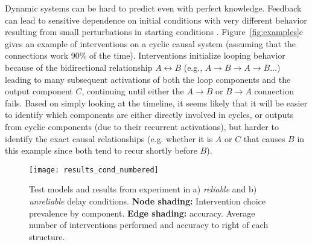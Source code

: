 \documentclass[10pt,letterpaper]{article}
\begin{document}
Dynamic systems can be hard to predict even with perfect knowledge.  Feedback can lead to sensitive dependence on initial conditions with very different behavior resulting from small perturbations in starting conditions \citep[e.g.][]{gleick1997chaos}.  
Figure~\ref{fig:examples}c gives an example of interventions on a cyclic causal system (assuming that the connections work 90\% of the time).  Interventions initialize looping behavior because of the bidirectional relationship $A \leftrightarrow B$ (e.g., $A\rightarrow B \rightarrow A \rightarrow B\ldots$) leading to many subsequent activations of both the loop components and the output component $C$, continuing until either the $A\rightarrow B$ or $B\rightarrow A$ connection fails. Based on simply looking at the timeline, it seems likely that it will be easier to identify which components are either directly involved in cycles, or outputs from cyclic components (due to their recurrent activations), but harder to identify the exact causal relationships (e.g. whether it is $A$ or $C$ that causes $B$ in this example since both tend to recur shortly before $B$).


\begin{figure*}[t]
   \centering
   \vspace{-.9cm}
   \texttt{[image: results\_cond\_numbered]}
   \caption{Test models and results from experiment in a) \emph{reliable} and b) \emph{unreliable} delay conditions.  \textbf{Node shading:} Intervention choice prevalence by component.  \textbf{Edge shading:} accuracy.   Average number of interventions performed and accuracy to right of each structure.}
   \label{fig:results_cond}
\end{figure*}
\end{document}
